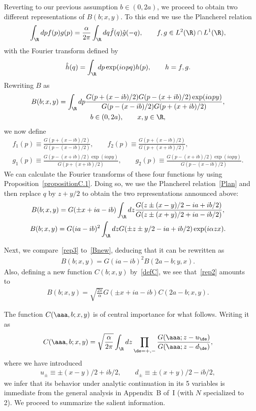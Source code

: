 \documentclass[pdftex]{sigma}
\numberwithin{equation}{section}
\begin{document}
Reverting to our previous assumption $b\in(0,2a)$, we proceed to obtain two dif\/ferent representations of $B(b;x,y)$. To this end we use the Plancherel relation
\begin{gather}\label{Plan}
\int_{\R}dpf(p)g(p)=\frac{\alpha}{2\pi}\int_{\R}dq\hat{f}(q)\hat{g}(-q),\qquad f,g\in L^2(\R)\cap L^1(\R),
\end{gather}
with the Fourier transform def\/ined by
\begin{gather}\label{Four}
\hat{h}(q)=\int_{\R}dp\exp(i\alpha pq)h(p),\qquad h=f,g.
\end{gather}
Rewriting $B$ as
\begin{gather}\label{Bnew}
B(b;x,y)=\int_{\R}dp\frac{G(p+(x-ib)/2)G(p-(x+ib)/2)\exp(i\alpha py)}{G(p-(x-ib)/2)G(p+(x+ib)/2)},\\
 b\in(0,2a),\qquad x,y\in\R,\nonumber
\end{gather}
we now def\/ine
\begin{gather}
f_1(p)\equiv\frac{G(p+(x-ib)/2)}{G(p-(x-ib)/2)},\qquad f_2(p)\equiv\frac{G(p+(x-ib)/2)}{G(p+(x+ib)/2)},
\\
g_1(p)\equiv\frac{G(p-(x+ib)/2)\exp(i\alpha py)}{G(p+(x+ib)/2)},\qquad
g_2(p)\equiv\frac{G(p-(x+ib)/2)\exp(i\alpha py)}{G(p-(x-ib)/2)}.
\end{gather}
We can calculate the Fourier transforms of these four functions by using Proposition~\ref{propositionC.1}. Doing so, we use the Plancherel relation~\eqref{Plan} and then replace $q$ by $z+y/2$ to obtain the two representations announced above:
\begin{gather}\label{rep2}
B(b;x,y)=G(\pm x +ia-ib)\int_{\R}dz \frac{G(z\pm (x-y)/2-ia+ib/2)}{G(z\pm (x+y)/2+ia-ib/2)},
\\
\label{rep3}
B(b;x,y)=G(ia-ib)^2\int_{\R}dz G(\pm z\pm y/2-ia+ib/2)\exp(i\alpha zx).
\end{gather}

Next, we compare~\eqref{rep3} to~\eqref{Bnew}, deducing that it can be rewritten as
\begin{gather}\label{BB}
B(b;x,y)=G(ia-ib)^2B(2a-b;y,x).
\end{gather}
Also, def\/ining a new function $C(b;x,y)$ by~\eqref{defC},
we see that~\eqref{rep2} amounts to
\begin{gather}\label{BC}
B(b;x,y)=\sqrt{\frac{2\pi}{\alpha}}G(\pm x +ia-ib)C(2a-b;x,y).
\end{gather}

The function $C(\aaa,b;x,y)$ is of central importance for what follows. Writing it as
\begin{gather}
C(\aaa,b;x,y)= \sqrt{\frac{\alpha}{2\pi}}\int_{\R}dz \prod_{\de=+,-}\frac{G(\aaa;z-u_{\de})}{G(\aaa;z-d_{\de})},
\end{gather}
where we have introduced
\begin{gather}
u_{\pm}\equiv \pm (x-y)/2+ib/2,\qquad d_{\pm}\equiv \pm (x+y)/2-ib/2,
\end{gather}
we infer that its behavior under analytic continuation in its 5 variables is immediate from the general analysis in Appendix~B of~I (with $N$ specialized to 2). We proceed to summarize the salient information.
\end{document}

